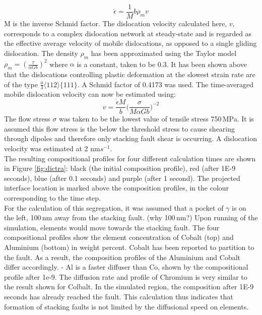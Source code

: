 \documentclass[a4paper,12pt,times,numbered,print,index]{Classes/PhDThesisPSnPDF}
\begin{document}
\begin{equation}
\dot{\epsilon} = \frac{1}{M}b\rho_{m}v
\label{eqn:orowan}
\end{equation}
M is the inverse Schmid factor. The dislocation velocity calculated here, $v$, corresponds to a complex dislocation network at steady-state and is regarded as the effective average velocity of mobile dislocations, as opposed to a single gliding dislocation. The density $\rho_{m}$ has been approximated using the Taylor model $\rho_{m}=(\frac{\tau}{\alpha Gb})^2$ where $\alpha$ is a constant, taken to be 0.3.\citep{} It has been shown above that the dislocations controlling plastic deformation at the slowest strain rate are of the type $\frac{a}{3}$$\langle112\rangle$$ \{111\}$. A Schmid factor of 0.4173 was used. The time-averaged mobile dislocation velocity can now be estimated using:
\begin{equation}
v = \frac{\dot{\epsilon}M}{b}\Big( \frac{\sigma}{M\alpha Gb} \Big) ^{-2}
\label{eqn:dislv}
\end{equation}
The flow stress $\sigma$ was taken to be the lowest value of tensile stress 750\,MPa. It is assumed this flow stress is the below the threshold stress to cause shearing through dipoles and therefore only stacking fault shear is occurring. A dislocation velocity was estimated at 2 nm$s^{-1}$.\\
The resulting compositional profiles for four different calculation times are shown in Figure \ref{fig:dictra}: black (the initial composition profile), red (after 1E-9 seconds), blue (after 0.1 seconds) and purple (after 1 second). The projected interface location is marked above the composition profiles, in the colour corresponding to the time step.\\
For the calculation of this segregation, it was assumed that a pocket of $\gamma$ is on the left, 100\,nm away from the stacking fault.  (why 100\,nm?) Upon running of the simulation, elements would move towards the stacking fault. 
The four compositional profiles show the element concentration of Cobalt (top) and Aluminium (bottom) in weight percent. Cobalt has been reported to partition to the fault\cite{}. As a result, the composition profiles of the Aluminium and Cobalt differ accordingly.
- Al is a faster diffuser than Co, shown by the compositional profile after 1e-9. The diffusion rate and profile of Chromium is very similar to the result shown for Colbalt.
In the simulated region, the composition after 1E-9 seconds has already reached the fault. This calculation thus indicates that formation of stacking faults is not limited by the diffusional speed on elements.
\end{document}
